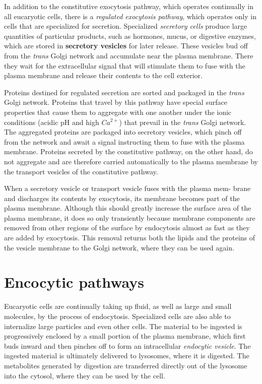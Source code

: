 In addition to the constitutive exocytosis pathway, which operates continually 
in all eucaryotic cells, there is a \textit{regulated exocytosis pathway},
which operates only in cells that are specialized for secretion. Specialized
\textit{secretory cells} produce large quantities of particular products, such as
hormones, mucus, or digestive enzymes, which are stored in \textbf{secretory
vesicles} for later release. These vesicles bud off from the \textit{trans} Golgi network 
and accumulate near the plasma membrane. There they wait for
the extracellular signal that will stimulate them to fuse with the plasma
membrane and release their contents to the cell exterior.

Proteins destined for regulated secretion are sorted and packaged in the
\textit{trans} Golgi network. Proteins that travel by this pathway have special
surface properties that cause them to aggregate with one another under
the ionic conditions (acidic pH and high $Ca^{2+}$) that prevail in the \textit{trans}
Golgi network. The aggregated proteins are packaged into secretory vesicles, 
which pinch off from the network and await a signal instructing
them to fuse with the plasma membrane. Proteins secreted by the constitutive 
pathway, on the other hand, do not aggregate and are therefore
carried automatically to the plasma membrane by the transport vesicles
of the constitutive pathway.

When a secretory vesicle or transport vesicle fuses with the plasma mem-
brane and discharges its contents by exocytosis, its membrane becomes
part of the plasma membrane. Although this should greatly increase the
surface area of the plasma membrane, it does so only transiently because
membrane components are removed from other regions of the surface by
endocytosis almost as fast as they are added by exocytosis. This removal
returns both the lipids and the proteins of the vesicle membrane to the
Golgi network, where they can be used again.

\section{Encocytic pathways}

Eucaryotic cells are continually taking up fluid, as well as large and
small molecules, by the process of endocytosis. Specialized cells are also
able to internalize large particles and even other cells. The material to
be ingested is progressively enclosed by a small portion of the plasma
membrane, which first buds inward and then pinches off to form an intracellular 
\textit{endocytic vesicle}. The ingested material is ultimately delivered to
lysosomes, where it is digested. The metabolites generated by digestion
are transferred directly out of the lysosome into the cytosol, where they
can be used by the cell.

